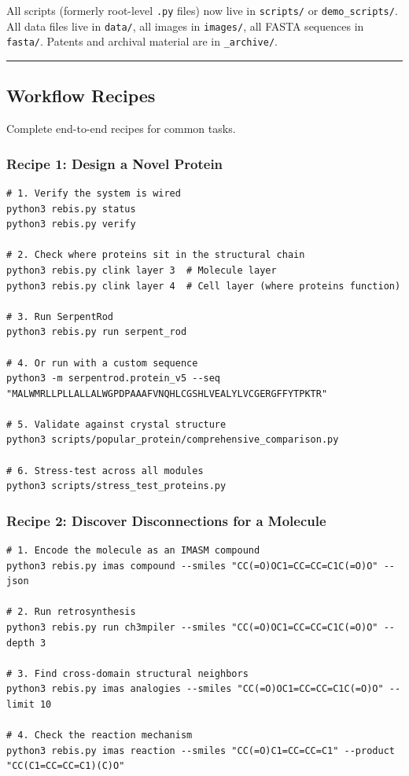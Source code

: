 All scripts (formerly root-level \texttt{.py} files) now live in
\texttt{scripts/} or \texttt{demo\_scripts/}. All data files live in
\texttt{data/}, all images in \texttt{images/}, all FASTA sequences in
\texttt{fasta/}. Patents and archival material are in
\texttt{\_archive/}.

\begin{center}\rule{0.5\linewidth}{0.5pt}\end{center}

\hypertarget{workflow-recipes}{%
\subsection{Workflow Recipes}\label{workflow-recipes}}

Complete end-to-end recipes for common tasks.

\hypertarget{recipe-1-design-a-novel-protein}{%
\subsubsection{Recipe 1: Design a Novel
Protein}\label{recipe-1-design-a-novel-protein}}

\begin{verbatim}
# 1. Verify the system is wired
python3 rebis.py status
python3 rebis.py verify

# 2. Check where proteins sit in the structural chain
python3 rebis.py clink layer 3  # Molecule layer
python3 rebis.py clink layer 4  # Cell layer (where proteins function)

# 3. Run SerpentRod
python3 rebis.py run serpent_rod

# 4. Or run with a custom sequence
python3 -m serpentrod.protein_v5 --seq "MALWMRLLPLLALLALWGPDPAAAFVNQHLCGSHLVEALYLVCGERGFFYTPKTR"

# 5. Validate against crystal structure
python3 scripts/popular_protein/comprehensive_comparison.py

# 6. Stress-test across all modules
python3 scripts/stress_test_proteins.py
\end{verbatim}

\hypertarget{recipe-2-discover-disconnections-for-a-molecule}{%
\subsubsection{Recipe 2: Discover Disconnections for a
Molecule}\label{recipe-2-discover-disconnections-for-a-molecule}}

\begin{verbatim}
# 1. Encode the molecule as an IMASM compound
python3 rebis.py imas compound --smiles "CC(=O)OC1=CC=CC=C1C(=O)O" --json

# 2. Run retrosynthesis
python3 rebis.py run ch3mpiler --smiles "CC(=O)OC1=CC=CC=C1C(=O)O" --depth 3

# 3. Find cross-domain structural neighbors
python3 rebis.py imas analogies --smiles "CC(=O)OC1=CC=CC=C1C(=O)O" --limit 10

# 4. Check the reaction mechanism
python3 rebis.py imas reaction --smiles "CC(=O)C1=CC=CC=C1" --product "CC(C1=CC=CC=C1)(C)O"
\end{verbatim}

